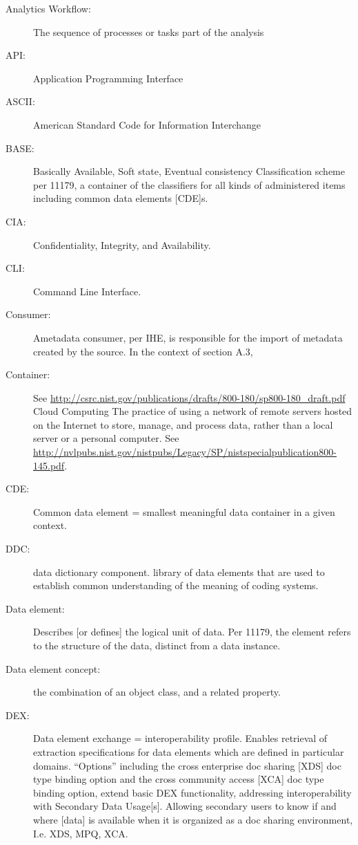 \begin{description}
\item[Analytics Workflow:] The sequence of processes or tasks part of
  the analysis

\item[API:] Application Programming Interface

\item[ASCII:] American Standard Code for Information Interchange

\item[BASE:] Basically Available, Soft state, Eventual consistency
  Classification scheme per 11179, a container of the classifiers for
  all kinds of administered items including common data elements
  [CDE]s.

\item[CIA:] Confidentiality, Integrity, and Availability.

\item[CLI:] Command Line Interface.

\item[Consumer:] Ametadata consumer, per IHE, is responsible for the
  import of metadata created by the source. In the context of section
  A.3,

\item[Container:] See
  \url{http://csrc.nist.gov/publications/drafts/800-180/sp800-180_draft.pdf}
  Cloud Computing The practice of using a network of remote servers
  hosted on the Internet to store, manage, and process data, rather
  than a local server or a personal computer. See
  \url{http://nvlpubs.nist.gov/nistpubs/Legacy/SP/nistspecialpublication800-145.pdf}.

\item[CDE:] Common data element = smallest meaningful data container
  in a given context.

\item[DDC:] data dictionary component. library of data elements that
  are used to establish common understanding of the meaning of coding
  systems.

\item[Data element:] Describes [or defines] the logical unit of
  data. Per 11179, the element refers to the structure of the data,
  distinct from a data instance.

\item[Data element concept:] the combination of an object class, and a
  related property.

\item[DEX:] Data element exchange = interoperability profile. Enables
  retrieval of extraction specifications for data elements which are
  defined in particular domains. ``Options'' including the cross
  enterprise doc sharing [XDS] doc type binding option and the cross
  community access [XCA] doc type binding option, extend basic DEX
  functionality, addressing interoperability with Secondary Data
  Usage[s]. Allowing secondary users to know if and where [data] is
  available when it is organized as a doc sharing environment,
  I.e. XDS, MPQ, XCA.


\end{description}
